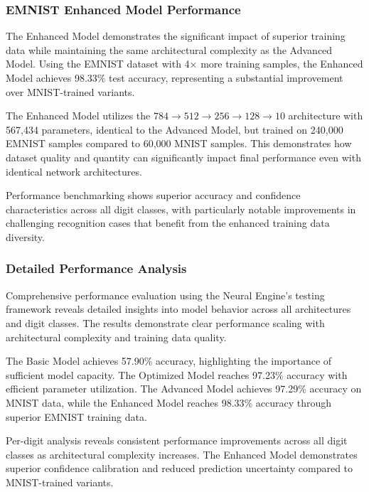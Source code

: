 \documentclass[11pt,a4paper]{report}
\begin{document}
\subsubsection{EMNIST Enhanced Model Performance}

The Enhanced Model demonstrates the significant impact of superior training data while maintaining the same architectural complexity as the Advanced Model. Using the EMNIST dataset with 4× more training samples, the Enhanced Model achieves 98.33\% test accuracy, representing a substantial improvement over MNIST-trained variants.

The Enhanced Model utilizes the $784 \rightarrow 512 \rightarrow 256 \rightarrow 128 \rightarrow 10$ architecture with 567,434 parameters, identical to the Advanced Model, but trained on 240,000 EMNIST samples compared to 60,000 MNIST samples. This demonstrates how dataset quality and quantity can significantly impact final performance even with identical network architectures.

Performance benchmarking shows superior accuracy and confidence characteristics across all digit classes, with particularly notable improvements in challenging recognition cases that benefit from the enhanced training data diversity.

\subsubsection{Detailed Performance Analysis}

Comprehensive performance evaluation using the Neural Engine's testing framework reveals detailed insights into model behavior across all architectures and digit classes. The results demonstrate clear performance scaling with architectural complexity and training data quality.

The Basic Model achieves 57.90\% accuracy, highlighting the importance of sufficient model capacity. The Optimized Model reaches 97.23\% accuracy with efficient parameter utilization. The Advanced Model achieves 97.29\% accuracy on MNIST data, while the Enhanced Model reaches 98.33\% accuracy through superior EMNIST training data.

Per-digit analysis reveals consistent performance improvements across all digit classes as architectural complexity increases. The Enhanced Model demonstrates superior confidence calibration and reduced prediction uncertainty compared to MNIST-trained variants.
\end{document}
